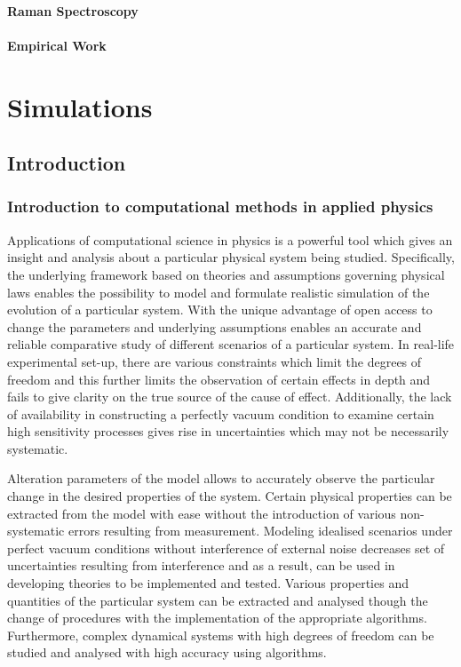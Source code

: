 \documentclass[11pt]{report}
\begin{document}
			\subsubsection{Raman Spectroscopy}
			\subsubsection{Empirical Work}
						
	\chapter{Simulations}
		\section{Introduction}

\label{sec:intro}    

\subsection{Introduction to computational methods in applied physics}


Applications of computational science in physics is a powerful tool which gives an insight and analysis about a particular physical system being studied. Specifically, the underlying framework based on theories and assumptions governing physical laws enables the possibility to model and formulate realistic simulation of the evolution of a particular system. With the unique advantage of open access to change the parameters and underlying assumptions enables an accurate and reliable comparative study of different scenarios of a particular system. In real-life experimental set-up, there are various constraints which limit the degrees of freedom and this further limits the observation of certain effects in depth and fails to give clarity on the true source of the cause of effect. Additionally, the lack of availability in constructing a perfectly vacuum condition to examine certain high sensitivity processes gives rise in uncertainties which may not be necessarily systematic. 

Alteration parameters of the model allows to accurately observe the particular change in the desired properties of the system. Certain physical properties can be extracted from the model with ease without the introduction of various non-systematic errors resulting from measurement. Modeling idealised scenarios under perfect vacuum conditions without interference of external noise decreases set of uncertainties resulting from interference and as a result, can be used in developing theories to be implemented and tested. Various properties and quantities of the particular system can be extracted and analysed though the change of procedures with the implementation of the appropriate algorithms. Furthermore, complex dynamical systems with high degrees of freedom can be studied and analysed with high accuracy using algorithms.
\end{document}
